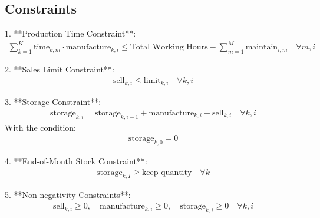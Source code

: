 \documentclass{article}
\begin{document}
\subsection*{Constraints}
1. **Production Time Constraint**:
\begin{align*}
\sum_{k=1}^{K} \text{time}_{k, m} \cdot \text{manufacture}_{k, i} \leq \text{Total Working Hours} - \sum_{m=1}^{M} \text{maintain}_{i, m} \quad \forall m, i
\end{align*}

2. **Sales Limit Constraint**:
\begin{align*}
\text{sell}_{k, i} \leq \text{limit}_{k, i} \quad \forall k, i
\end{align*}

3. **Storage Constraint**:
\begin{align*}
\text{storage}_{k, i} = \text{storage}_{k, i-1} + \text{manufacture}_{k, i} - \text{sell}_{k, i} \quad \forall k, i
\end{align*}
With the condition:
\begin{align*}
\text{storage}_{k, 0} = 0
\end{align*}

4. **End-of-Month Stock Constraint**:
\begin{align*}
\text{storage}_{k, I} \geq \text{keep\_quantity} \quad \forall k
\end{align*}

5. **Non-negativity Constraints**:
\begin{align*}
\text{sell}_{k, i} \geq 0, \quad \text{manufacture}_{k, i} \geq 0, \quad \text{storage}_{k, i} \geq 0 \quad \forall k, i
\end{align*}
\end{document}

